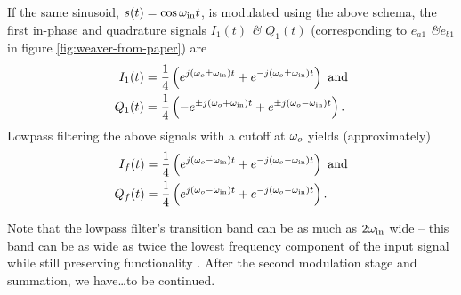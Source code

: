\documentclass[12pt]{article}
\newcommand{\amp}{\textit{\&}\xspace}
\begin{document}
If the same sinusoid, \(s(t) = \cos \omega_\text{in} t\), is modulated using the
above schema, the first in-phase and quadrature signals \(I_1(t)\) \amp
\(Q_1(t)\) (corresponding to \(e_{a1}\) \amp \(e_{b1}\) in figure
\ref{fig:weaver-from-paper}) are
\begin{align*}
	I_1(t) &= \frac 1 4 \left(
			e^{j (\omega_o \pm \omega_\text{in}) t} + e^{-j (\omega_o \pm \omega_\text{in}) t}
		\right) \text{ and} \\
	Q_1(t) &= \frac 1 4 \left(
			-e^{\pm j (\omega_o + \omega_\text{in}) t} + e^{\pm j (\omega_o - \omega_\text{in}) t}
		\right).
\end{align*}
Lowpass filtering the above signals with a cutoff at \(\omega_o\) yields
(approximately)
\begin{align*}
	I_f(t) &= \frac 1 4 \left(
			e^{j (\omega_o - \omega_\text{in}) t} + e^{-j (\omega_o - \omega_\text{in}) t}
		\right) \text{ and} \\
	Q_f(t) &= \frac 1 4 \left(
			e^{j (\omega_o - \omega_\text{in}) t} + e^{-j (\omega_o - \omega_\text{in}) t}
		\right).
\end{align*}

Note that the lowpass filter's transition band can be as much as \(2 \omega_\text{in}\)
wide -- this band can be as wide as twice the lowest frequency component of the
input signal while still preserving functionality \autocite{weaver-rowell}.
After the second modulation stage and summation, we have\ldots to be continued.

\printbibliography
\end{document}
